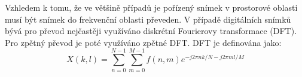 Vzhledem k tomu, že ve většině případů je pořízený snímek v prostorové oblasti musí být snímek do frekvenční oblasti převeden. V případě digitálních snímků bývá pro převod nejčastěji využíváno diskrétní Fourierovy transformace (DFT). Pro zpětný převod je poté využíváno zpětné DFT. DFT je definována jako:
\begin{equation}
X(k,l)=\sum_{n=0}^{N-1} \sum_{m=0}^{M-1} f(n,m) e^{-j2\pi nk/N - j2\pi ml/M}
\end{equation}
